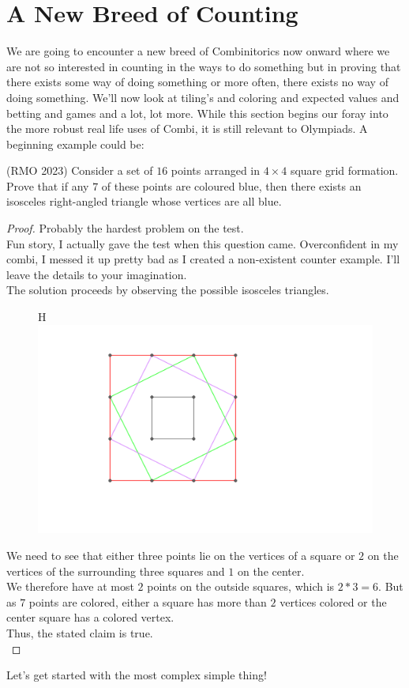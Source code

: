 \chapter{A New Breed of Counting}
We are going to encounter a new breed of Combinitorics now onward where we are not so interested in counting in the ways to do something but in proving that there exists some way of doing something or more often, there exists no way of doing something. We'll now look at tiling's and coloring and expected values and betting and games and a lot, lot more. While this section begins our foray into the more robust real life uses of Combi, it is still relevant to Olympiads. A beginning example could be:\\
\begin{example}
    (RMO 2023) Consider a set of $16$ points arranged in $4 \times 4$ square grid formation. Prove that if any $7$ of these points are coloured blue, then there exists an isosceles right-angled triangle whose vertices are all blue.
\end{example}
\begin{proof}
    Probably the hardest problem on the test.\\
    Fun story, I actually gave the test when this question came. Overconfident in my combi, I messed it up pretty bad as I created a non-existent counter example. I'll leave the details to your imagination.\\
    The solution proceeds by observing the possible isosceles triangles.\\
    \begin{figure}{H}
        \centering
        \includegraphics[width=0.5\linewidth]{Photos/RMO6 2023.png}
        
    \end{figure}
    We need to see that either three points lie on the vertices of a square or $2$ on the vertices of the surrounding three squares and $1$ on the center.\\
    We therefore have at most $2$ points on the outside squares, which is $2*3=6$. But as $7$ points are colored, either a square has more than $2$ vertices colored or the center square has a colored vertex.\\
    Thus, the stated claim is true.\\
\end{proof}
Let's get started with the most complex simple thing!
